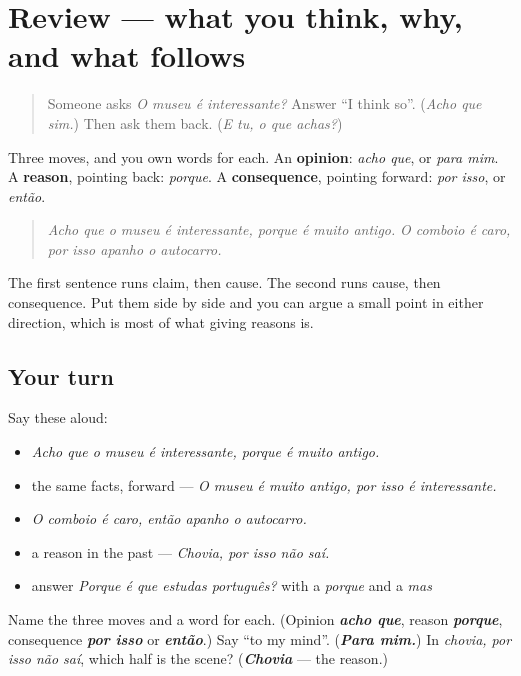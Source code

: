 \section[(review)]{Review — what you think, why, and what follows}

\label{lesson:PT-C261-revisao-opiniao}



\begin{quote}
Someone asks \emph{O museu é interessante?} Answer \textquotedblleft{}I think so\textquotedblright{}. (\emph{Acho que sim.}) Then ask them back. (\emph{E tu, o que achas?})
\end{quote}

\begin{grammarlens}[title={What you've built}]
Three moves, and you own words for each. An \textbf{opinion}: \emph{acho que}, or \emph{para mim}. A \textbf{reason}, pointing back: \emph{porque}. A \textbf{consequence}, pointing forward: \emph{por isso}, or \emph{então}.

\begin{quote}
\emph{Acho que o museu é interessante, porque é muito antigo.} \emph{O comboio é caro, por isso apanho o autocarro.}
\end{quote}

The first sentence runs claim, then cause. The second runs cause, then consequence. Put them side by side and you can argue a small point in either direction, which is most of what giving reasons is.
\end{grammarlens}

\subsection*{Your turn}
Say these aloud:

\begin{itemize}
\raggedright
  \item \emph{Acho que o museu é interessante, porque é muito antigo.}
  \item the same facts, forward — \emph{O museu é muito antigo, por isso é interessante.}
  \item \emph{O comboio é caro, então apanho o autocarro.}
  \item a reason in the past — \emph{Chovia, por isso não saí.}
  \item answer \emph{Porque é que estudas português?} with a \emph{porque} and a \emph{mas}
\end{itemize}

\begin{tcolorbox}[breakable,colback=teal!4,colframe=teal!35!black,title={Before you move on}]
Name the three moves and a word for each. (Opinion \emph{\textbf{acho que}}, reason \emph{\textbf{porque}}, consequence \emph{\textbf{por isso}} or \emph{\textbf{então}}.) Say \textquotedblleft{}to my mind\textquotedblright{}. (\emph{\textbf{Para mim.}}) In \emph{chovia, por isso não saí}, which half is the scene? (\emph{\textbf{Chovia}} — the reason.)
\end{tcolorbox}
